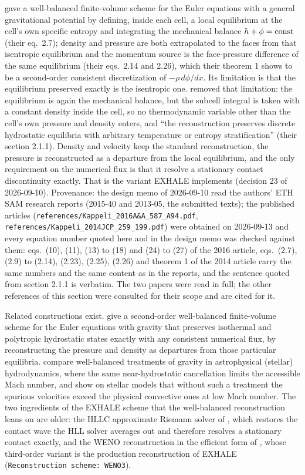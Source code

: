 \documentclass[english,a4paper]{my_memo}
\begin{document}
\citet{Kappeli2014} gave a well-balanced finite-volume scheme for the Euler
equations with a general gravitational potential by defining, inside each
cell, a local equilibrium at the cell's own specific entropy and integrating
the mechanical balance $h + \phi = {\rm const}$ (their eq.\ 2.7); density and
pressure are both extrapolated to the faces from that isentropic equilibrium
and the momentum source is the face-pressure difference of the same
equilibrium (their eqs.\ 2.14 and 2.26), which their theorem 1 shows to be a
second-order consistent discretization of $-\rho\,d\phi/dx$. Its limitation
is that the equilibrium preserved exactly is the isentropic one.
\citet{Kappeli2016} removed that limitation: the equilibrium is again the
mechanical balance, but the subcell integral is taken with a constant density
inside the cell, so no thermodynamic variable other than the cell's own
pressure and density enters, and ``the reconstruction preserves discrete
hydrostatic equilibria with arbitrary temperature or entropy stratification''
(their section 2.1.1). Density and velocity keep the standard reconstruction,
the pressure is reconstructed as a departure from the local equilibrium, and
the only requirement on the numerical flux is that it resolve a stationary
contact discontinuity exactly. That is the variant EXHALE implements
(decision 23 of 2026-09-10).
Provenance: the design memo of 2026-09-10 read the authors' ETH SAM
research reports (2015-40 and 2013-05, the submitted texts); the published
articles (\texttt{references/Kappeli\_2016A\&A\_587\_A94.pdf},
\texttt{references/Kappeli\_2014JCP\_259\_199.pdf}) were obtained on
2026-09-13 and every equation number quoted here and in the design memo was
checked against them: eqs.\ (10), (11), (13) to (18) and (24) to (27) of the
2016 article, eqs.\ (2.7), (2.9) to (2.14), (2.23), (2.25), (2.26) and
theorem 1 of the 2014 article carry the same numbers and the same content
as in the reports, and the sentence quoted from section 2.1.1 is verbatim.
The two papers were read in full; the other references of this section were
consulted for their scope and are cited for it.

Related constructions exist. \citet{Chandrashekar2015} give a second-order
well-balanced finite-volume scheme for the Euler equations with gravity that
preserves isothermal and polytropic hydrostatic states exactly with any
consistent numerical flux, by reconstructing the pressure and density as
departures from those particular equilibria. \citet{Edelmann2021} compare
well-balanced treatments of gravity in astrophysical (stellar) hydrodynamics,
where the same near-hydrostatic cancellation limits the accessible Mach
number, and show on stellar models that without such a treatment the spurious
velocities exceed the physical convective ones at low Mach number. The two
ingredients of the EXHALE scheme that the well-balanced reconstruction leans
on are older: the HLLC approximate Riemann solver of \citet{Toro1994}, which
restores the contact wave the HLL solver averages out and therefore resolves a
stationary contact exactly, and the WENO reconstruction in the efficient form
of \citet{Jiang1996}, whose third-order variant is the production
reconstruction of EXHALE (\texttt{Reconstruction scheme:\ WENO3}).
\end{document}
